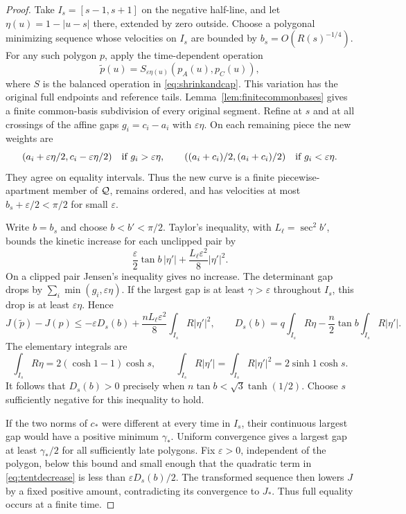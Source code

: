 \begin{proof}
Take $I_s=[s-1,s+1]$ on the negative half-line, and let
$\eta(u)=1-|u-s|$ there, extended by zero outside. Choose a
polygonal minimizing sequence whose velocities on $I_s$ are
bounded by $b_s=O(R(s)^{-1/4})$. For any such polygon $p$, apply
the time-dependent operation
\[
 \widetilde p(u)=S_{\varepsilon\eta(u)}(p_A(u),p_C(u)),
\]
where $S$ is the balanced operation in \eqref{eq:shrinkandcap}.
This variation has the original full endpoints and reference tails.
Lemma~\ref{lem:finitecommonbases} gives a finite common-basis
subdivision of every original segment. Refine at $s$ and at all
crossings of the affine gaps $g_i=c_i-a_i$ with
$\varepsilon\eta$. On each remaining piece the new weights are
\[
 (a_i+\varepsilon\eta/2,c_i-\varepsilon\eta/2)
       \quad\hbox{if }g_i>\varepsilon\eta,
 \qquad
 ((a_i+c_i)/2,(a_i+c_i)/2)
       \quad\hbox{if }g_i<\varepsilon\eta.
\]
They agree on equality intervals. Thus the new curve is a finite
piecewise-apartment member of $\mathcal Q$, remains ordered, and has
velocities at most $b_s+\varepsilon/2<\pi/2$ for small
$\varepsilon$.

Write $b=b_s$ and choose $b<b'<\pi/2$. Taylor's inequality,
with $L_\ell=\sec^2 b'$, bounds the kinetic increase for each
unclipped pair by
\[
 \frac{\varepsilon}{2}\tan b\,|\eta'|
       +\frac{L_\ell\varepsilon^2}{8}|\eta'|^2.
\]
On a clipped pair Jensen's inequality gives no increase. The
determinant gap drops by $\sum_i\min(g_i,\varepsilon\eta)$.
If the largest gap is at least $\gamma>\varepsilon$ throughout
$I_s$, this drop is at least $\varepsilon\eta$. Hence
\begin{equation}\label{eq:tentdecrease}
 J(\widetilde p)-J(p)
 \le-\varepsilon D_s(b)
       +\frac{nL_\ell\varepsilon^2}{8}\int_{I_s}R|\eta'|^2,
 \qquad
 D_s(b)=q\int_{I_s}R\eta-\frac n2\tan b\int_{I_s}R|\eta'|.
\end{equation}
The elementary integrals are
\[
 \int_{I_s}R\eta=2(\cosh1-1)\cosh s,\qquad
 \int_{I_s}R|\eta'|=\int_{I_s}R|\eta'|^2=2\sinh1\cosh s.
\]
It follows that $D_s(b)>0$ precisely when
$n\tan b<\sqrt3\tanh(1/2)$. Choose $s$ sufficiently negative
for this inequality to hold.

If the two norms of $c_*$ were different at every time in $I_s$,
their continuous largest gap would have a positive minimum
$\gamma_*$. Uniform convergence gives a largest gap at least
$\gamma_*/2$ for all sufficiently late polygons. Fix
$\varepsilon>0$, independent of the polygon, below this bound
and small enough that the quadratic term in \eqref{eq:tentdecrease}
is less than $\varepsilon D_s(b)/2$. The transformed sequence
then lowers $J$ by a fixed positive amount, contradicting its
convergence to $J_*$. Thus full equality occurs at a finite time.
\end{proof}

